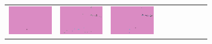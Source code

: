 \documentclass{ipol}
\begin{document}
\begin{figure}[ht]
\begin{subfigure}[t]{\linewidth}
\begin{tabular}{ccccccccc}
                \includegraphics[width=\s]{images/tower/LINEAR/iso_64_grids.png}&
                \includegraphics[width=\s]{images/tower/PPG/iso_64_grids.png}&
                \includegraphics[width=\s]{images/tower/VNG/iso_64_grids.png}\\

\end{tabular}
\end{subfigure}
\end{figure}
\end{document}
